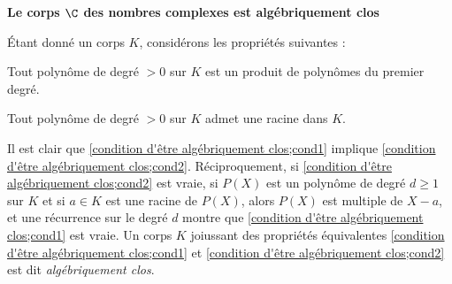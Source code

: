 \documentclass[11pt, %
  title in boldface,
  theorem in new line,
  theorem numbering = section,
  number theorems separately,
  simple name,
]{beaulivre}
\begin{document}
    \begin{flushleft}
        \textbf{Le corps \( \C \) des nombres complexes est algébriquement clos}
    \end{flushleft}

    Étant donné un corps \( K \), considérons les propriétés suivantes :
    \begin{enumerate-alph}
        \item \label{condition d'être algébriquement clos;cond1} Tout polynôme de degré \( > 0 \) sur \( K \) est un produit de polynômes du premier degré.
        \item \label{condition d'être algébriquement clos;cond2} Tout polynôme de degré \( > 0 \) sur \( K \) admet une racine dans \( K \).
    \end{enumerate-alph}
    Il est clair que \ref{condition d'être algébriquement clos;cond1} implique \ref{condition d'être algébriquement clos;cond2}. Réciproquement, si \ref{condition d'être algébriquement clos;cond2} est vraie, si \( P(X) \) est un polynôme de degré \( d \geqslant 1 \) sur \( K \) et si \( a \in K \) est une racine de \( P(X) \), alors \( P(X) \) est multiple de \( X-a \), et une récurrence sur le degré \( d \) montre que \ref{condition d'être algébriquement clos;cond1} est vraie. Un corps \( K \) joiussant des propriétés équivalentes \ref{condition d'être algébriquement clos;cond1} et \ref{condition d'être algébriquement clos;cond2} est dit \emph{algébriquement clos}.
\end{document}
